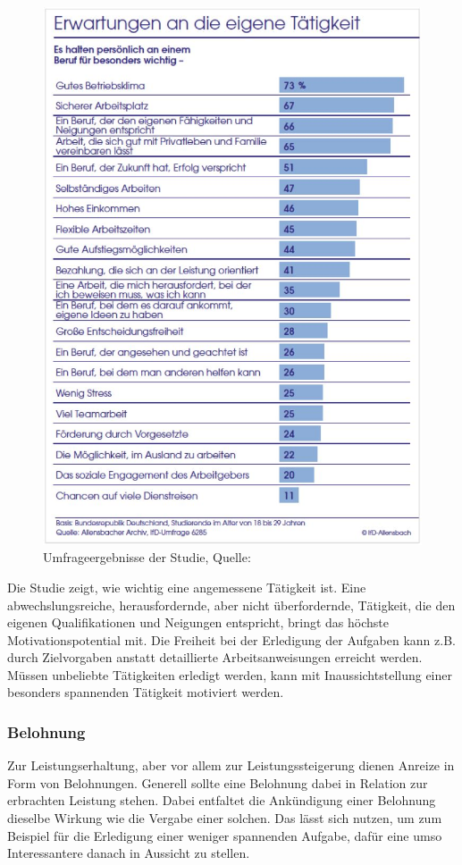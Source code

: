 \begin{figure}[!h]
\centering
\includegraphics[width=0.8\linewidth]{grafiken/abb4.jpg}
\caption{Umfrageergebnisse der Studie, \newline Quelle: \cite[S. 53]{Allensbach.2014}}
\label{fig:Gehirn4}
\end{figure}

Die Studie zeigt, wie wichtig eine angemessene Tätigkeit ist. Eine abwechslungsreiche, herausfordernde, aber nicht überfordernde, Tätigkeit, die den eigenen Qualifikationen und Neigungen entspricht, bringt das höchste Motivationspotential mit. 
Die Freiheit bei der Erledigung der Aufgaben kann z.B. durch Zielvorgaben anstatt detaillierte Arbeitsanweisungen erreicht werden. 
Müssen unbeliebte Tätigkeiten erledigt werden, kann mit Inaussichtstellung einer besonders spannenden Tätigkeit motiviert werden. 

\subsubsection{Belohnung}
\label{sec:Belohnung}
Zur Leistungserhaltung, aber vor allem zur Leistungssteigerung dienen Anreize in Form von Belohnungen. Generell sollte eine Belohnung dabei in Relation zur erbrachten Leistung stehen. Dabei entfaltet die Ankündigung einer Belohnung dieselbe Wirkung wie die Vergabe einer solchen. Das lässt sich nutzen, um zum Beispiel für die Erledigung einer weniger spannenden Aufgabe, dafür eine umso Interessantere danach in Aussicht zu stellen. 


